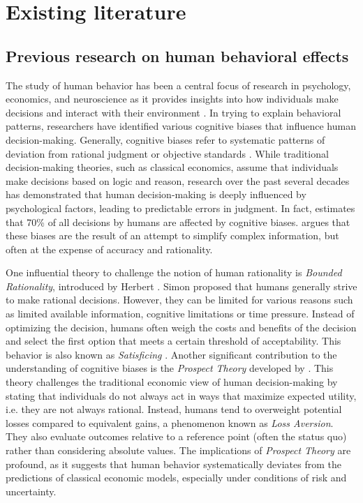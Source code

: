 \section{Existing literature}
\label{chapter:theoreticalbackground}

\subsection{Previous research on human behavioral effects}
\par The study of human behavior has been a central focus of research in psychology, economics, and neuroscience as it provides insights into how individuals make decisions and interact with their environment \parencite{juarez2018analyzing}. In trying to explain behavioral patterns, researchers have identified various cognitive biases that influence human decision-making. Generally, cognitive biases refer to systematic patterns of deviation from rational judgment or objective standards \parencite{tversky1974judgment}. While traditional decision-making theories, such as classical economics, assume that individuals make decisions based on logic and reason, research over the past several decades has demonstrated that human decision-making is deeply influenced by psychological factors, leading to predictable errors in judgment. In fact, \textcite{juarez2018analyzing} estimates that 70\% of all decisions by humans are affected by cognitive biases. \textcite{kahneman2017thinking} argues that these biases are the result of an attempt to simplify complex information, but often at the expense of accuracy and rationality.

\par One influential theory to challenge the notion of human rationality is \textit{Bounded Rationality}, introduced by Herbert \textcite{simon1990bounded}. Simon proposed that humans generally strive to make rational decisions. However, they can be limited for various reasons such as limited available information, cognitive limitations or time pressure. Instead of optimizing the decision, humans often weigh the costs and benefits of the decision and select the first option that meets a certain threshold of acceptability. This behavior is also known as \textit{Satisficing} \parencite{simon1990bounded}. Another significant contribution to the understanding of cognitive biases is the \textit{Prospect Theory} developed by \textcite{kahneman1979prospect}. This theory challenges the traditional economic view of human decision-making by stating that individuals do not always act in ways that maximize expected utility, i.e. they are not always rational. Instead, humans tend to overweight potential losses compared to equivalent gains, a phenomenon known as \textit{Loss Aversion}. They also evaluate outcomes relative to a reference point (often the status quo) rather than considering absolute values. The implications of \textit{Prospect Theory} are profound, as it suggests that human behavior systematically deviates from the predictions of classical economic models, especially under conditions of risk and uncertainty.

